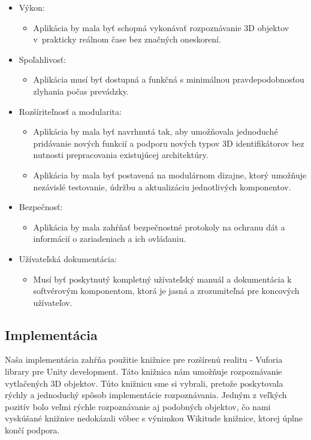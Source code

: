 \begin{itemize}
    \item Výkon:
    \begin{itemize}
        \item Aplikácia by mala byť schopná vykonávať rozpoznávanie 3D objektov v~prakticky reálnom čase bez značných oneskorení.
    \end{itemize}
    \item Spoľahlivosť:
    \begin{itemize}
        \item Aplikácia musí byť dostupná a funkčná s minimálnou pravdepodobnosťou zlyhania počas prevádzky.
    \end{itemize}
    \item Rozšíriteľnosť a modularita:
    \begin{itemize}
        \item Aplikácia by mala byť navrhnutá tak, aby umožňovala jednoduché pridávanie nových funkcií a podporu nových typov 3D identifikátorov bez nutnosti prepracovania existujúcej architektúry.
        \item Aplikácia by mala byť postavená na modulárnom dizajne, ktorý umožňuje nezávislé testovanie, údržbu a aktualizáciu jednotlivých komponentov.
    \end{itemize}
    \item Bezpečnosť:
    \begin{itemize}
        \item Aplikácia by mala zahŕňať bezpečnostné protokoly na ochranu dát a informácií o zariadeniach a ich ovládaniu.
    \end{itemize}
    \item Užívateľská dokumentácia:
    \begin{itemize}
        \item Musí byť poskytnutý kompletný užívateľský manuál a dokumentácia k softvérovým komponentom, ktorá je jasná a zrozumiteľná pre koncových užívateľov.
    \end{itemize}
\end{itemize}

\subsection{Implementácia}

Naša implementácia zahŕňa použitie knižnice pre rozšírenú realitu - Vuforia library pre Unity development. Táto knižnica nám umožňuje rozpoznávanie vytlačených 3D objektov. Túto knižnicu sme si vybrali, pretože poskytovala rýchly a jednoduchý spôsob implementácie rozpoznávania. Jedným z veľkých pozitív bolo veľmi rýchle rozpoznávanie aj podobných objektov, čo nami vyskúšané knižnice nedokázali vôbec s výnimkou Wikitude knižnice, ktorej úplne končí podpora.  

